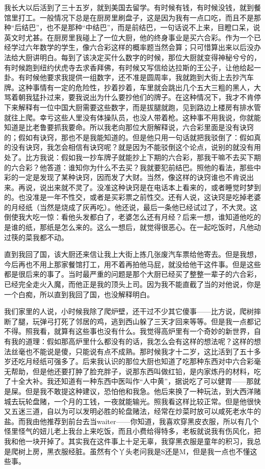 我长大以后活到了三十五岁，就到美国去留学。有时候有钱，有时候没钱，就到餐馆里打工。一般情况下总是在厨房里刷盘子，这是因为我有一点口吃，而且不是那种“后结巴”，也不是那种“中结巴”，而是前结巴，一句话说不上来，目瞪口呆，说英文时尤甚。在厨房里我碰上了一位大厨，他的终身事业是买六合彩。作为一个已经学过六年数学的学生，像六合彩这样的概率题当然会算；只可惜算出来以后没办法给大厨讲明白。每到了该决定买什么数字的时候，那位大厨就变得神秘兮兮的，有时候跑到纽约伏虎寺去求香拜佛，有时候又写信给达拉斯的王公子，让他给起一卦。有时候他要求我提供一组数字，还不准是圆周率，我就跑到大街上去抄汽车牌。这种事情有一定的危险性，抄着抄着，车里就会跳出几个五大三粗的黑人，大骂着朝我猛扑过来，要我说出为什么要抄他们的牌子。在这种情况下，我才不肯停下来解释有一位中国大厨需要这些数字，而是拔腿就跑，见到路边上楼房有排水管就往上爬。幸亏这些人里没有体操队员，也没人带着枪。这种事不用我说，你就能知道是比老鲁要抓我要命。所以我老向那位大厨解释说，六合彩里面是没有诀窍的；假如有诀窍，那也不是我能知道的。但是他只用一句话就把我驳倒了：假如真的没有诀窍，我怎会相信有诀窍呢？就是因为不能驳倒这个论点，说别的就没有用处了。比方我说：假如我一抄车牌子就能抄上下期的六合彩，那我干嘛不去买下期的六合彩？他答道：谁知你为什么不去买？我就要犯前结巴。照他的看法，那些中彩的一定是发现了某种诀窍，因而发了大财。当然，像这样的诀窍谁也不肯说出来。再说，说出来就不灵了。没准这种诀窍是在电话本上看来的，或者睡觉时梦到的。也没准是一年不性交，或者是买彩票之前性交。还有人说，这诀窍是吃掉老婆的月经纸（当然是烧成了灰再吃）。他还说，最后一条他已经试过了，不大灵。这倒使我大吃一惊：看他头发都白了，老婆怎么还有月经？后来一想，谁知道他吃的是谁的纸，那纸是怎么来的。这么一想后，就觉得很恶心。在一起吃饭时，凡他动过筷的菜我都不动。 

直到我回了国，该大厨还来信让我上大街上拣几张废汽车票给他寄去。但是我想，今后再也不用上那家餐馆打工，用不着再拍他马屁，就没给他干这件事。但是这些都是很后来的事了。当时最严重的问题是那个大厨已经买了整整一辈子的六合彩，已经完全走火入魔，而他正是我的顶头上司。因为我不能直截了当的对他说，你是一个白痴，所以直到我回了国，也没解释明白。 

我们家里的人说，小时候我除了爬炉壁，还干过不少其它傻事——比方说，爬树摔断了腿，玩弹弓打死了邻居的鸡，逃到西山躲了三天才回来等等。但是我一点都记不得。照我看，就算有这些事也没有什么。我觉得高炉里有一个奇妙的新世界，自有我的道理：假如那高炉里什么都没有的话，我怎么会有这样的想法呢？这样的想法丝毫也不能说是傻，只能说有点不成熟。那时候我才十二岁，这比活到了五十多岁还吃月经纸可强多了。后来我认识的那位大厨也知道了吃那种东西对中六合彩毫无帮助，但是他还要打肿了脸充胖子，说那东西叫做红铅，是内家炼丹的材料，吃了十全大补。我还知道有一种东西中医叫作“人中黄”，据说吃了可以健胃——那就是屎。但是我不敢提这种建议，恐怕他和我急。他后来换了一种玩法，到大西洋赌城去玩轮盘赌，一个月的工钱，一夜就能输光。照我看这样比较正常。但是他很快又五迷三道，自以为可以发明必胜的轮盘赌法，经常在炒菜时放可以咸死老水牛的盐。而我由他推荐到前台去当waiter——你知道，我喜欢穿黑皮衣服，所以有几个怪里怪气的妞儿老上我台上来吃饭，而且小费给得特多，老板就说我有伤风化，把我和他一块开掉了。其实我在这件事上十足无辜，我穿黑衣服是童年的积习，我总是爬树上房，黑衣服经脏。虽然有个丫头老问我是S还是M，但是我一点也不懂这些事。 

